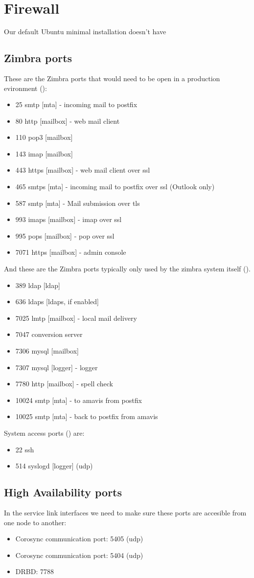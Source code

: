\section {Firewall}
Our default Ubuntu minimal installation doesn't have 
\subsection {Zimbra ports}
These are the Zimbra ports that would need to be open in a production evironment (\cite{ZimbraWikiPorts}):
\begin{itemize}
  \item 25 smtp [mta] - incoming mail to postfix
  \item 80 http [mailbox] - web mail client
  \item 110 pop3 [mailbox]
  \item 143 imap [mailbox]
  \item 443 https [mailbox] - web mail client over ssl
  \item 465 smtps [mta] - incoming mail to postfix over ssl (Outlook only)
  \item 587 smtp [mta] - Mail submission over tls
  \item 993 imaps [mailbox] - imap over ssl
  \item 995 pops [mailbox] - pop over ssl
  \item 7071 https [mailbox] - admin console
\end{itemize}
And these are the Zimbra ports typically only used by the zimbra system itself (\cite{ZimbraWikiPorts}).
\begin{itemize}
  \item 389 ldap [ldap]
  \item 636 ldaps [ldaps, if enabled]
  \item 7025 lmtp [mailbox] - local mail delivery
  \item 7047 conversion server
  \item 7306 mysql [mailbox]
  \item 7307 mysql [logger] - logger
  \item 7780 http [mailbox] - spell check
  \item 10024 smtp [mta] - to amavis from postfix
  \item 10025 smtp [mta] - back to postfix from amavis
\end{itemize}
System access ports (\cite{ZimbraWikiPorts}) are:
\begin{itemize}
  \item 22 ssh
  \item 514 syslogd [logger] (udp)
\end{itemize}

\subsection {High Availability ports}
In the service link interfaces we need to make sure these ports are accesible from one node to another:
\begin{itemize}
  \item Corosync communication port: 5405 (udp)
  \item Corosync communication port: 5404 (udp)
  \item DRBD: 7788
\end{itemize}


